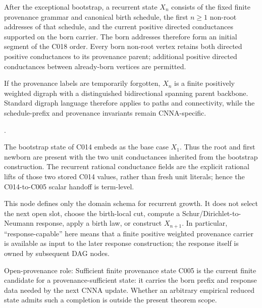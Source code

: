 After the exceptional bootstrap, a recurrent state $X_n$ consists of the fixed
finite provenance grammar and canonical birth schedule, the first $n\ge1$
non-root addresses of that schedule, and the current positive directed
conductances supported on the born carrier.  The born addresses therefore form
an initial segment of the C018 order.  Every born non-root vertex retains both
directed positive conductances to its provenance parent; additional positive
directed conductances between already-born vertices are permitted.

If the provenance labels are temporarily forgotten, $X_n$ is a finite positively weighted digraph with a distinguished bidirectional spanning parent backbone.  Standard digraph language therefore applies to paths and connectivity, while the schedule-prefix and provenance invariants remain CNNA-specific.

\cite[Ch.~1, pp.~1--30]{BangJensenGutin2009Digraphs}.


The bootstrap state of C014 embeds as the base case $X_1$.  Thus the root
and first newborn are present with the two unit conductances inherited from the
bootstrap construction.  The recurrent rational conductance fields are the
explicit rational lifts of those two stored C014 values, rather than fresh
unit literals; hence the C014-to-C005 scalar handoff is term-level.

This node defines only the domain schema for recurrent growth.  It does not
select the next open slot, choose the birth-local cut, compute a Schur/Dirichlet-to-Neumann
response, apply a birth law, or construct $X_{n+1}$.  In particular,
``response-capable'' here means that a finite positive weighted provenance
carrier is available as input to the later response construction; the response
itself is owned by subsequent DAG nodes.

\begin{cnnaInfoBox}{Open-provenance role: Sufficient finite provenance state}
C005 is the current finite candidate for a provenance-sufficient state: it carries the born prefix and response data needed by the next CNNA update.  Whether an arbitrary empirical reduced state admits such a completion is outside the present theorem scope.
\end{cnnaInfoBox}

